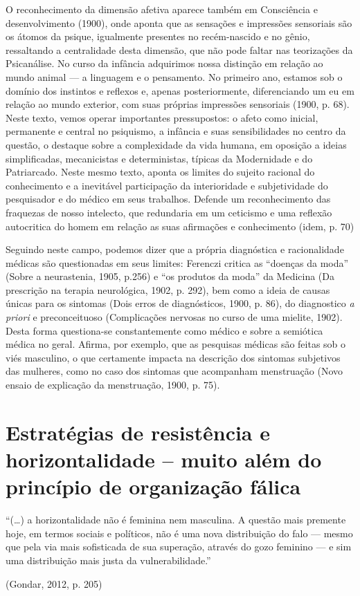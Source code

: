 O reconhecimento da dimensão afetiva aparece também em Consciência e
desenvolvimento (1900), onde aponta que as sensações e impressões
sensoriais são os átomos da psique, igualmente presentes no
recém-nascido e no gênio, ressaltando a centralidade desta dimensão, que
não pode faltar nas teorizações da Psicanálise. No curso da infância
adquirimos nossa distinção em relação ao mundo animal --- a linguagem e o
pensamento. No primeiro ano, estamos sob o domínio dos instintos e
reflexos e, apenas posteriormente, diferenciando um eu em relação ao
mundo exterior, com suas próprias impressões sensoriais (1900, p. 68).
Neste texto, vemos operar importantes pressupostos: o afeto como
inicial, permanente e central no psiquismo, a infância e suas
sensibilidades no centro da questão, o destaque sobre a complexidade da
vida humana, em oposição a ideias simplificadas, mecanicistas e
deterministas, típicas da Modernidade e do Patriarcado. Neste mesmo
texto, aponta os limites do sujeito racional do conhecimento e a
inevitável participação da interioridade e subjetividade do pesquisador
e do médico em seus trabalhos. Defende um reconhecimento das fraquezas
de nosso intelecto, que redundaria em um ceticismo e uma reflexão
autocritica do homem em relação as suas afirmações e conhecimento (idem,
p. 70)

Seguindo neste campo, podemos dizer que a própria diagnóstica e
racionalidade médicas são questionadas em seus limites: Ferenczi critica
as ``doenças da moda'' (Sobre a neurastenia, 1905, p.256) e ``os
produtos da moda'' da Medicina (Da prescrição na terapia neurológica,
1902, p. 292), bem como a ideia de causas únicas para os sintomas (Dois
erros de diagnósticos, 1900, p. 86), do diagnostico \emph{a priori} e
preconceituoso (Complicações nervosas no curso de uma mielite, 1902).
Desta forma questiona-se constantemente como médico e sobre a semiótica
médica no geral. Afirma, por exemplo, que as pesquisas médicas são
feitas sob o viés masculino, o que certamente impacta na descrição dos
sintomas subjetivos das mulheres, como no caso dos sintomas que
acompanham menstruação (Novo ensaio de explicação da menstruação, 1900,
p. 75).

\section{Estratégias de resistência e horizontalidade -- muito além do
princípio de organização fálica }

\epigraph{``(\ldots{}) a horizontalidade não é feminina nem masculina.
A questão mais premente hoje, em termos sociais e políticos,
não é uma nova distribuição do falo --- mesmo que pela
via mais sofisticada de sua superação, através do gozo feminino
--- e sim uma distribuição mais justa da vulnerabilidade.''}{(Gondar, 2012, p. 205)}

